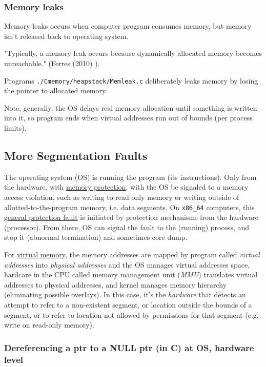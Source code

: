 \documentclass[10pt]{amsart}
\begin{document}
\begin{multicols*}{2}
\subsubsection{Memory leaks}  

Memory leaks occurs when computer program consumes memory, but memory isn't released back to operating system.  

"Typically, a memory leak occurs because dynamically allocated memory becomes unreachable."  (Ferres (2010) \cite{Ferr2010}).  

Programs \verb|./Cmemory/heapstack/Memleak.c| deliberately leaks memory by losing the pointer to allocated memory.  

Note, generally, the OS delays real memory allocation until something is written into it, so program ends when virtual addresses run out of bounds (per process limits).  

\subsection{More Segmentation Faults}  

The operating system (OS) is running the program (its instructions).  Only from the hardware, with \href{https://en.wikipedia.org/wiki/Memory_protection}{memory protection}, with the OS be signaled to a memory access violation, such as writing to read-only memory or writing outside of allotted-to-the-program memory, i.e. data segments.  On \verb|x86_64| computers, this \href{https://en.wikipedia.org/wiki/General_protection_fault}{general protection fault} is initiated by protection mechanisms from the hardware (processor).  From there, OS can signal the fault to the (running) process, and stop it (abnormal termination) and sometimes core dump. 

For \href{https://en.wikipedia.org/wiki/Virtual_memory}{virtual memory}, the memory addresses are mapped by program called \emph{virtual addresses} into \emph{physical addresses} and the OS manages virtual addresses space, hardcare in the CPU called memory management unit (\emph{MMU}) translates virtual addresses to physical addresses, and kernel manages memory hierarchy (eliminating possible overlays).  In this case, it's the \emph{hardware} that detects an attempt to refer to a non-existent segment, or location outside the bounds of a segment, or to refer to location not allowed by permissions for that segment (e.g. write on read-only memory).          

\subsubsection{Dereferencing a ptr to a NULL ptr (in C) at OS, hardware level}


\end{multicols*}
\end{document}
